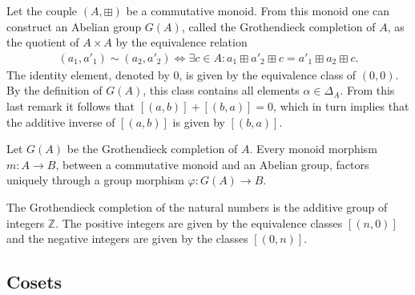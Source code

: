 
    \begin{construct}\label{group:grothendieck_completion}
        Let the couple $(A,\boxplus)$ be a commutative monoid. From this monoid one can construct an Abelian group $G(A)$, called the Grothendieck completion of $A$, as the quotient of $A\times A$ by the equivalence relation
        \begin{gather}
            (a_1,a'_1)\sim (a_2,a'_2) \iff \exists c\in A: a_1 \boxplus a'_2 \boxplus c = a'_1 \boxplus a_2 \boxplus c.
        \end{gather}
        The identity element, denoted by 0, is given by the equivalence class of $(0,0)$. By the definition of $G(A)$, this class contains all elements $\alpha\in\Delta_A$. From this last remark it follows that $[(a,b)] + [(b,a)] = 0$, which in turn implies that the additive inverse of $[(a,b)]$ is given by $[(b,a)]$.
    \end{construct}
    \begin{uproperty}
        Let $G(A)$ be the Grothendieck completion of $A$. Every monoid morphism $m:A\rightarrow B$, between a commutative monoid and an Abelian group, factors uniquely through a group morphism $\varphi:G(A)\rightarrow B$.
    \end{uproperty}

    \begin{example}[Integers]
        The Grothendieck completion of the natural numbers is the additive group of integers $\mathbb{Z}$. The positive integers are given by the equivalence classes $[(n,0)]$ and the negative integers are given by the classes $[(0,n)]$.
    \end{example}

\subsection{Cosets}

